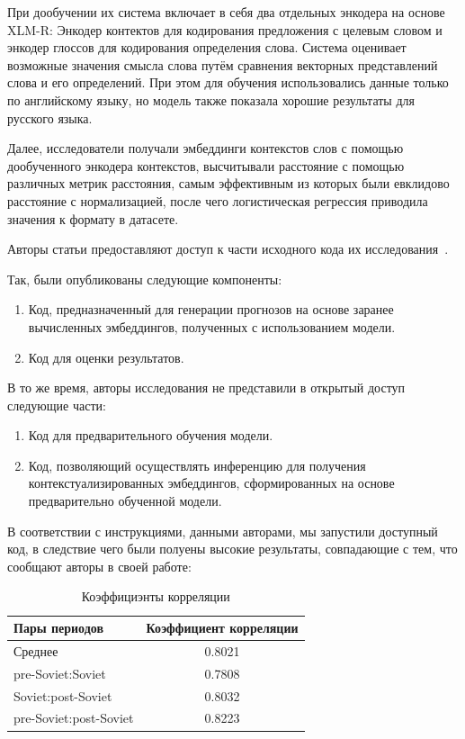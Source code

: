 \documentclass[LI,VKR]{HSEUniversity}
\begin{document}
При дообучении их система включает в себя два отдельных энкодера на основе XLM-R:
Энкодер контектов для кодирования предложения с целевым словом и
энкодер глоссов для кодирования определения слова.
Система оценивает возможные значения смысла слова путём сравнения векторных представлений слова
и его определений.
При этом для обучения использовались данные только по английскому языку,
но модель также показала хорошие результаты для русского языка.

Далее, исследователи получали эмбеддинги контекстов слов с помощью
дообученного энкодера контекстов, высчитывали расстояние с помощью различных метрик расстояния,
самым эффективным из которых были евклидово расстояние с нормализацией, после чего
логистическая регрессия приводила значения к формату в датасете.

Авторы статьи предоставляют доступ к части исходного кода их исследования~\cite{GlossReaderGitHub}.

Так, были опубликованы следующие компоненты:
\begin{enumerate}
    \item Код, предназначенный для генерации прогнозов на основе заранее вычисленных эмбеддингов,
полученных с использованием модели.
    \item Код для оценки результатов.
\end{enumerate}

В то же время, авторы исследования не представили в открытый доступ следующие части:
\begin{enumerate}
    \item Код для предварительного обучения модели.
    \item Код, позволяющий осуществлять инференцию для получения контекстуализированных
    эмбеддингов, сформированных на основе предварительно обученной модели.
\end{enumerate}

В соответствии с инструкциями, данными авторами, мы запустили доступный код,
в следствие чего были полуены высокие результаты, совпадающие с тем, что сообщают
авторы в своей работе:

\begin{table}[H]
\centering
\caption{Коэффициэнты корреляции}
\begin{tabular}{lc}
\hline
Пары периодов                  & Коэффициент корреляции \\
\hline
Среднее            & 0.8021                  \\
pre-Soviet:Soviet           & 0.7808                  \\
Soviet:post-Soviet          & 0.8032                  \\
pre-Soviet:post-Soviet      & 0.8223                  \\
\hline
\end{tabular}
\end{table}
\end{document}

